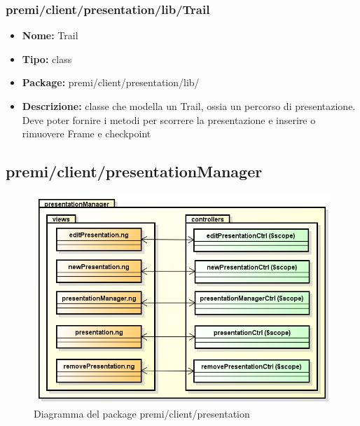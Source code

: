 \subsubsection{premi/client/presentation/lib/Trail}
\begin{itemize}
  \item[] \textbf{Nome:} Trail
  \item[] \textbf{Tipo:} class
  \item[] \textbf{Package:} premi/client/presentation/lib/
  \item[] \textbf{Descrizione:} classe che modella un Trail, ossia un percorso di presentazione. Deve poter fornire i metodi per scorrere la presentazione e inserire o rimuovere Frame e checkpoint
\end{itemize}



\subsection{premi/client/presentationManager}
\begin{figure}[!h]
\begin{center}
\includegraphics[scale=0.45]{img/diapkg/presentationManager.png}
\caption{Diagramma del package premi/client/presentation}
\end{center}
\end{figure}


